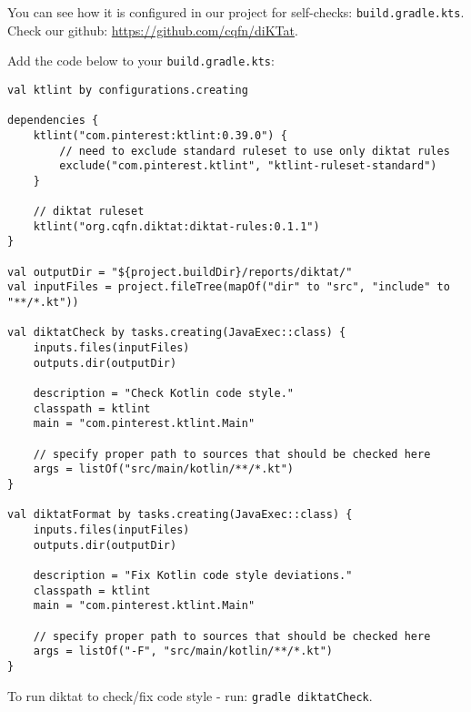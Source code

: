 You can see how it is configured in our project for self-checks: \verb|build.gradle.kts|. Check our github: \url{https://github.com/cqfn/diKTat}.
\par Add the code below to your \verb|build.gradle.kts|:
\par
\begin{verbatim}
val ktlint by configurations.creating

dependencies {
    ktlint("com.pinterest:ktlint:0.39.0") {
        // need to exclude standard ruleset to use only diktat rules
        exclude("com.pinterest.ktlint", "ktlint-ruleset-standard")
    }

    // diktat ruleset
    ktlint("org.cqfn.diktat:diktat-rules:0.1.1")
}

val outputDir = "${project.buildDir}/reports/diktat/"
val inputFiles = project.fileTree(mapOf("dir" to "src", "include" to "**/*.kt"))

val diktatCheck by tasks.creating(JavaExec::class) {
    inputs.files(inputFiles)
    outputs.dir(outputDir)

    description = "Check Kotlin code style."
    classpath = ktlint
    main = "com.pinterest.ktlint.Main"

    // specify proper path to sources that should be checked here
    args = listOf("src/main/kotlin/**/*.kt")
}

val diktatFormat by tasks.creating(JavaExec::class) {
    inputs.files(inputFiles)
    outputs.dir(outputDir)

    description = "Fix Kotlin code style deviations."
    classpath = ktlint
    main = "com.pinterest.ktlint.Main"

    // specify proper path to sources that should be checked here
    args = listOf("-F", "src/main/kotlin/**/*.kt")
}
\end{verbatim}
\par To run diktat to check/fix code style - run: \verb|gradle diktatCheck|.